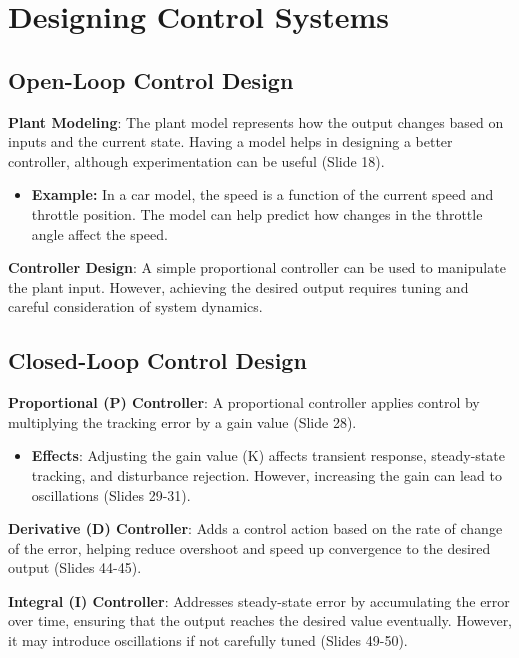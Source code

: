 \documentclass[
  14pt,
  a4paper,
  numbers=noendperiod,
  headinclude=true,
  footinclude=true,
  DIV=calc]{scrreprt}
\providecommand{\tightlist}{%
  \setlength{\itemsep}{0pt}\setlength{\parskip}{0pt}}\usepackage{longtable,booktabs,array}
\begin{document}
\section{Designing Control Systems}\label{designing-control-systems}

\subsection{Open-Loop Control Design}\label{open-loop-control-design}

\textbf{Plant Modeling}: The plant model represents how the output
changes based on inputs and the current state. Having a model helps in
designing a better controller, although experimentation can be useful
(Slide 18).

\begin{itemize}
\tightlist
\item
  \textbf{Example:} In a car model, the speed is a function of the
  current speed and throttle position. The model can help predict how
  changes in the throttle angle affect the speed.
\end{itemize}

\textbf{Controller Design}: A simple proportional controller can be used
to manipulate the plant input. However, achieving the desired output
requires tuning and careful consideration of system dynamics.

\subsection{Closed-Loop Control
Design}\label{closed-loop-control-design}

\textbf{Proportional (P) Controller}: A proportional controller applies
control by multiplying the tracking error by a gain value (Slide 28).

\begin{itemize}
\tightlist
\item
  \textbf{Effects}: Adjusting the gain value (Κ) affects transient
  response, steady-state tracking, and disturbance rejection. However,
  increasing the gain can lead to oscillations (Slides 29-31).
\end{itemize}

\textbf{Derivative (D) Controller}: Adds a control action based on the
rate of change of the error, helping reduce overshoot and speed up
convergence to the desired output (Slides 44-45).

\textbf{Integral (I) Controller}: Addresses steady-state error by
accumulating the error over time, ensuring that the output reaches the
desired value eventually. However, it may introduce oscillations if not
carefully tuned (Slides 49-50).
\end{document}
